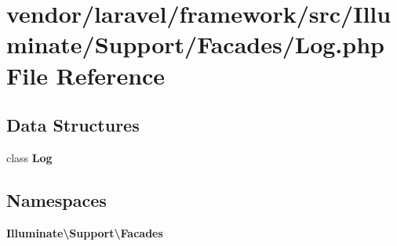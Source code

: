 \section{vendor/laravel/framework/src/\+Illuminate/\+Support/\+Facades/\+Log.php File Reference}
\label{_support_2_facades_2_log_8php}
\subsection*{Data Structures}
\begin{DoxyCompactItemize}
\item 
class {\bf Log}
\end{DoxyCompactItemize}
\subsection*{Namespaces}
\begin{DoxyCompactItemize}
\item 
 {\bf Illuminate\textbackslash{}\+Support\textbackslash{}\+Facades}
\end{DoxyCompactItemize}
